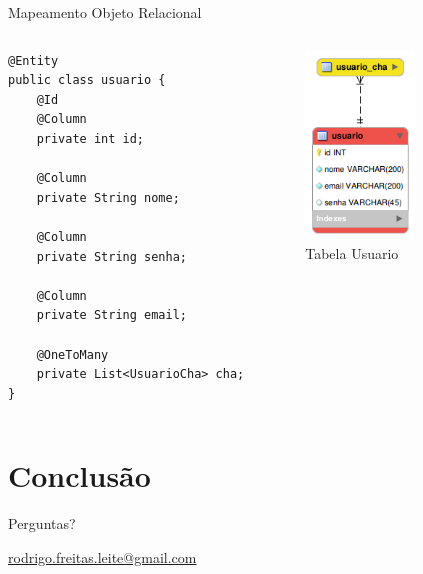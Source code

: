\documentclass[xcolor=dvipsnames]{beamer}
\begin{document}
\begin{frame}[fragile]{Mapeamento Objeto Relacional}
	\begin{columns}[c]
			\begin{lstlisting}
@Entity
public class usuario {
	@Id
	@Column
	private int id;

	@Column
	private String nome;

	@Column
	private String senha;
		
	@Column
	private String email;		
	
	@OneToMany
	private List<UsuarioCha> cha;
}
			\end{lstlisting}							
			\begin{figure}[!htb]
				\centering
				\includegraphics[keepaspectratio=true,height=5cm]{usuario-ER.png}
				\caption{Tabela Usuario}
				\label{usuario-ER}
			\end{figure}	
	\end{columns}
\end{frame}




\section{Conclusão}
	\begin{frame}{Perguntas?}
		\titlepage
		\begin{center}					
		 \href{mailto:rodrigo.freitas.leite@gmail.com}{rodrigo.freitas.leite@gmail.com}	
		\end{center}
			
	\end{frame}
\end{document}

